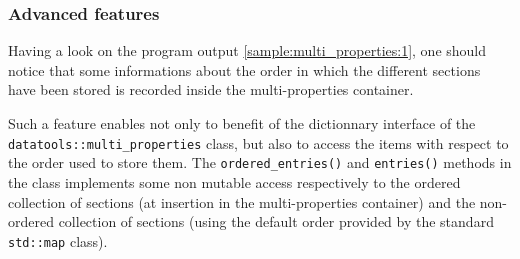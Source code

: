 \subsubsection{Advanced features}


\pn Having a look on the program output \ref{sample:multi_properties:1}, one
should notice that some informations about the order in which the different
sections have been stored is recorded inside the multi-properties container.

\pn  Such a feature  enables not  only to  benefit of  the dictionnary
interface   of  the   \\  \texttt{datatools::multi\_properties}
class, but also to access the  items with respect to the order used to
store  them.  The  \texttt{ordered\_entries()}  and \texttt{entries()}
methods in  the class implements some non  mutable access respectively
to  the   ordered  collection  of   sections  (at  insertion   in  the
multi-properties container) and the non-ordered collection of sections
(using the  default order  provided by the  standard \texttt{std::map}
class).





